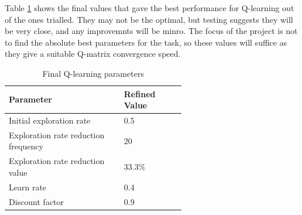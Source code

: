 \documentclass[12pt,a4paper]{article}
\begin{document}
Table \ref{q_params} shows the final values that gave the best performance for Q-learning out of the ones trialled. They may not be the optimal, but testing suggests they will be very close, and any improvemnts will be minro. The focus of the project is not to find the absolute best parameters for the task, so these values will suffice as they give a suitable Q-matrix convergence speed.
\begin{table}[htb]
\centering
\caption{Final Q-learning parameters}

\label{q_params}
\begin{tabular}{>{\raggedright}p{0.4\linewidth}p{0.2\linewidth}}\hline
Parameter & Refined Value\\ \hline\hline
Initial exploration rate & 0.5\\ \hline
Exploration rate reduction frequency & 20\\ \hline
Exploration rate reduction value & 33.3\% \\\hline
Learn rate & 0.4 \\\hline
Discount factor & 0.9 \\\hline
\end{tabular}
\end{table}
\end{document}
